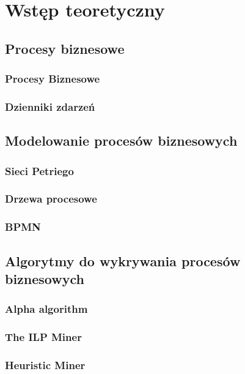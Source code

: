 \chapter{Wstęp teoretyczny}
\label{cha:wstepTeoretyczny}


\section{Procesy biznesowe}
\label{sec:procesyBiznesowe}
\subsection{Procesy Biznesowe}
\subsection{Dzienniki zdarzeń}

\section{Modelowanie procesów biznesowych}
\label{sec:modelowanie}

\subsection{Sieci Petriego}
\subsection{Drzewa procesowe}
\subsection{BPMN}

\section{Algorytmy do wykrywania procesów biznesowych}
\label{sec:algorytmy}
\subsection{Alpha algorithm}
\subsection{The ILP Miner}
\subsection{Heuristic Miner}

